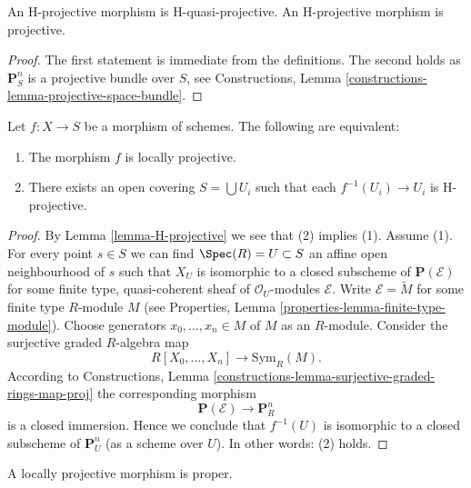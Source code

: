 \begin{lemma}
\label{lemma-H-projective}
An H-projective morphism is H-quasi-projective.
An H-projective morphism is projective.
\end{lemma}

\begin{proof}
The first statement is immediate from the definitions.
The second holds as $\mathbf{P}^n_S$ is a projective bundle over $S$, see
Constructions, Lemma \ref{constructions-lemma-projective-space-bundle}.
\end{proof}

\begin{lemma}
\label{lemma-characterize-locally-projective}
Let $f : X \to S$ be a morphism of schemes.
The following are equivalent:
\begin{enumerate}
\item The morphism $f$ is locally projective.
\item There exists an open covering $S = \bigcup U_i$ such
that each $f^{-1}(U_i) \to U_i$ is H-projective.
\end{enumerate}
\end{lemma}

\begin{proof}
By Lemma \ref{lemma-H-projective} we see that (2) implies (1). Assume (1).
For every point $s \in S$ we can find $\Spec(R) = U \subset S$
an affine open neighbourhood of $s$ such that $X_U$ is isomorphic to a
closed subscheme of $\mathbf{P}(\mathcal{E})$ for some finite type,
quasi-coherent sheaf of $\mathcal{O}_U$-modules $\mathcal{E}$.
Write $\mathcal{E} = \widetilde{M}$ for some finite type
$R$-module $M$ (see
Properties, Lemma \ref{properties-lemma-finite-type-module}).
Choose generators $x_0, \ldots, x_n \in M$ of $M$ as an $R$-module.
Consider the surjective graded $R$-algebra map
$$
R[X_0, \ldots, X_n] \longrightarrow \text{Sym}_R(M).
$$
According to
Constructions, Lemma \ref{constructions-lemma-surjective-graded-rings-map-proj}
the corresponding morphism
$$
\mathbf{P}(\mathcal{E}) \to \mathbf{P}^n_R
$$
is a closed immersion. Hence we conclude that $f^{-1}(U)$ is isomorphic
to a closed subscheme of $\mathbf{P}^n_U$ (as a scheme over $U$).
In other words: (2) holds.
\end{proof}

\begin{lemma}
\label{lemma-locally-projective-proper}
A locally projective morphism is proper.
\end{lemma}

